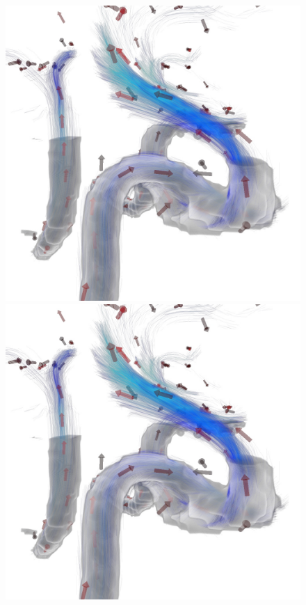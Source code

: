 \documentclass{egpubl}
\begin{document}
\begin{figure}[t]
  \centering
  \begin{minipage}[b]{0.3\linewidth}\centering
    \includegraphics[width=1.0\linewidth]{snapshots/flow/cgf/screenshot_Flow.jpg}
  \end{minipage}\hfill
  \begin{minipage}[b]{0.3\linewidth}\centering
    \includegraphics[trim={18cm 16cm 8cm 10cm}, clip, width=1.0\linewidth]{snapshots/flow/cgf/screenshot_Flow.jpg}

\end{minipage}
\end{figure}
\end{document}
